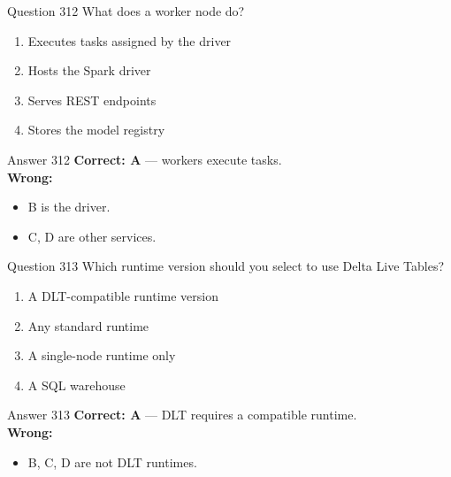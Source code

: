 \documentclass[aspectratio=169,11pt]{beamer}
\begin{document}
	\begin{frame}{Question 312}
		What does a worker node do?
		\begin{enumerate}[label=\Alph*.]
			\item Executes tasks assigned by the driver
			\item Hosts the Spark driver
			\item Serves REST endpoints
			\item Stores the model registry
		\end{enumerate}
	\end{frame}
	\begin{frame}{Answer 312}
		\textbf{Correct: A} --- workers execute tasks.\\
		\vspace{0.5em}
		\textbf{Wrong:}
		\begin{itemize}
			\item B is the driver.
			\item C, D are other services.
		\end{itemize}
	\end{frame}
	
	\begin{frame}{Question 313}
		Which runtime version should you select to use Delta Live Tables?
		\begin{enumerate}[label=\Alph*.]
			\item A DLT-compatible runtime version
			\item Any standard runtime
			\item A single-node runtime only
			\item A SQL warehouse
		\end{enumerate}
	\end{frame}
	\begin{frame}{Answer 313}
		\textbf{Correct: A} --- DLT requires a compatible runtime.\\
		\vspace{0.5em}
		\textbf{Wrong:}
		\begin{itemize}
			\item B, C, D are not DLT runtimes.
		\end{itemize}
	\end{frame}
	
\end{document}
